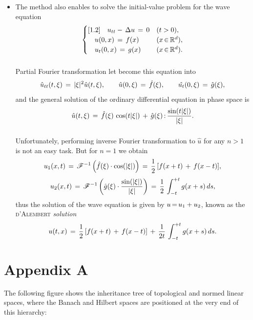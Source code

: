 \documentclass[11pt,twoside]{article}
\begin{document}
\begin{itemize}[leftmargin=4mm]
\item[2.]
The method also enables to solve the initial-value problem
for the wave equation
\[
\begin{cases}[1.2]
\quad u_{tt} - \, \Delta u \= 0  & (t > 0),    \\
\quad u(0,x) \= f(x)             & (x \xeof \Rd),\\
\quad u_t(0,x) \= g(x)           & (x \xeof \Rd).\\
\end{cases}
\]

\subparagraph{}
Partial Fourier transformation let become this equation into
\[
\hat{u}_{tt}(t,\xi) \= \abs{\xi} ^2 \hat{u}(t,\xi),
\quad \quad
\hat{u}(0,\xi) \= \hat{f}(\xi),
\quad \quad
\hat{u_t}(0,\xi) \= \hat{g}(\xi),
\]
and the general solution of the ordinary differential equation
in phase space is 
\[
\hat{u}(t,\xi)
\=
\hat{f}(\xi) \, \cos( t \abs{\xi} )
\, + \,
\hat{g}(\xi) \: \frac{\sin(t \abs{\xi} )}{\abs{\xi} }.
\]

\subparagraph{}
Unfortunately,
performing inverse Fourier transformation to $\hat{u}$
for any $n >1$ is not an easy task.
But for $n=1$ we obtain
\[
u_1(x,t) \=
\FT^{-1}\left(\hat{f}(\xi) \cdot \cos(\abs{\xi} ) \right)
\=
\frac{1}{2}\,[f(x+t) \, + \, f(x-t)],
\]
\[
u_2(x,t) \=
\FT^{-1}\left(\hat{g}(\xi) \cdot
\frac{\sin(\abs{\xi} )}{\abs{\xi} } \right)
\=
\frac{1}{2}\, \int_{-t}^{+t} g(x+s) \, ds,
\]
thus the solution of the wave equation is given by $u \eq u_1+u_2$,
known as the \textsc{d'Alembert} \textit{solution}
\[
u(t,x) \=
\frac{1}{2} \, [f(x+t) \, + \, f(x-t)]
\, + \,
\frac{1}{2t}\, \int_{-t}^{+t} g(x+s) \, ds.
\]
\end{itemize}

\newpage
\thispagestyle{empty}
\fancyhead[C] {}
\fancyhead[OL]{}
\fancyhead[ER]{}
\section*{Appendix A}                                                          %
The following figure shows the inheritance tree
of topological and normed linear spaces,
where the Banach and Hilbert spaces are positioned
at the very end of this hierarchy:
\end{document}
